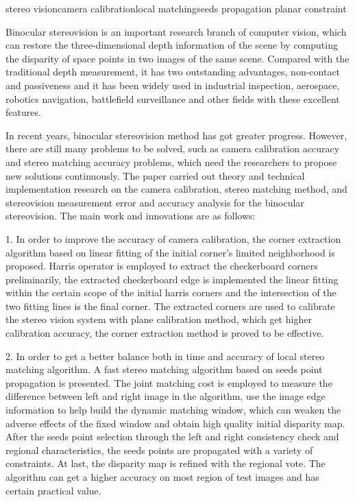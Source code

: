 
\begin{Eabstract}{stereo vision}{camera  calibration}{local  matching}{seeds  propagation}{
planar constraint}

Binocular stereovision is an important research branch of computer vision, which 
can  restore  the  three-dimensional  depth  information  of  the  scene  by  computing  the 
disparity  of  space  points  in  two  images  of  the  same  scene.  Compared  with  the 
traditional  depth  measurement,  it  has  two  outstanding  advantages,  non-contact  and 
passiveness and it has been widely used in industrial inspection, aerospace,  robotics 
navigation, battlefield surveillance and other fields with these excellent features. 

In recent years, binocular stereovision method has got greater progress. However, 
there are still many problems to be solved, such  as camera  calibration accuracy  and 
stereo  matching  accuracy  problems,  which  need  the  researchers  to  propose  new 
solutions  continuously.  The  paper  carried  out  theory  and  technical  implementation 
research  on  the  camera  calibration,  stereo  matching  method,  and  stereovision 
measurement  error  and  accuracy  analysis  for  the  binocular  stereovision.  The  main 
work and innovations are as follows: 

1. In order to improve the accuracy of camera calibration,  the corner extraction 
algorithm  based  on  linear  fitting  of  the  initial  corner’s  limited  neighborhood  is 
proposed.  Harris  operator  is  employed  to  extract  the  checkerboard  corners 
preliminarily, the extracted checkerboard edge is implemented the linear fitting within 
the  certain  scope  of  the  initial  harris  corners  and  the  intersection  of  the  two  fitting 
lines is the final corner. The extracted corners are used to calibrate the stereo vision 
system  with  plane  calibration  method,  which  get  higher  calibration  accuracy,  the 
corner extraction method is proved to be effective.  

2.  In  order  to  get  a  better  balance  both  in  time  and  accuracy  of  local  stereo 
matching  algorithm.  A  fast  stereo  matching  algorithm  based  on  seeds  point 
propagation  is  presented.  The  joint  matching  cost  is  employed  to  measure  the 
difference  between  left  and  right  image  in  the  algorithm,  use  the  image  edge 
information  to  help  build  the  dynamic  matching  window,  which  can  weaken  the 
adverse  effects  of  the  fixed  window  and  obtain  high  quality  initial  disparity  map. 
After  the  seeds  point  selection  through  the  left  and  right  consistency  check  and 
regional characteristics, the seeds points are propagated with a variety of constraints. 
At last, the disparity map is refined with the regional vote. The algorithm can  get  a 
higher accuracy on most region of test images and has certain practical value.


\end{Eabstract}
